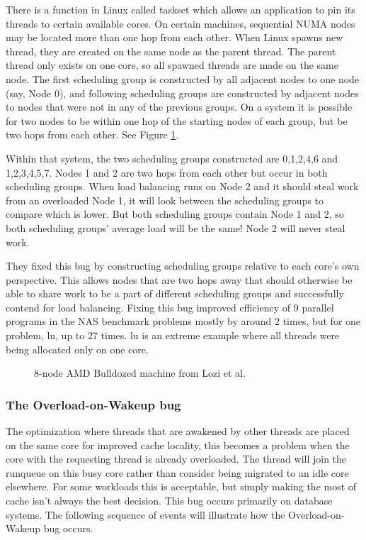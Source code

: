 \documentclass{sig-alternate}
\begin{document}
There is a function in Linux called taskset which allows an application to pin its threads to certain available cores. On certain machines, sequential NUMA nodes may be located more than one hop from each other. When Linux spawns new thread, they are created on the same node as the parent thread. The parent thread only exists on one core, so all spawned threads are made on the same node. The first scheduling group is constructed by all adjacent nodes to one node (say, Node 0), and following scheduling groups are constructed by adjacent nodes to nodes that were not in any of the previous groups. On a system it is possible for two nodes to be within one hop of the starting nodes of each group, but be two hops from each other. See Figure \ref{fig:cfs_schedgroups}.~\cite{Lozi:2016}

Within that system, the two scheduling groups constructed are {0,1,2,4,6} and {1,2,3,4,5,7}. Nodes 1 and 2 are two hops from each other but occur in both scheduling groups. When load balancing runs on Node 2 and it should steal work from an overloaded Node 1, it will look between the scheduling groups to compare which is lower. But both scheduling groups contain Node 1 and 2, so both scheduling groups' average load will be the same! Node 2 will never steal work.~\cite{Lozi:2016}

They fixed this bug by constructing scheduling groups relative to each core's own perspective. This allows nodes that are two hops away that should otherwise be able to share work to be a part of different scheduling groups and successfully contend for load balancing. Fixing this bug improved efficiency of 9 parallel programs in the NAS benchmark problems mostly by around 2 times, but for one problem, lu, up to 27 times. lu is an extreme example where all threads were being allocated only on one core.~\cite{Lozi:2016}

\begin{figure}
\centering
{}
\caption{8-node AMD Bulldozed machine from Lozi et al.~\cite{Lozi:2016}}
\label{fig:cfs_schedgroups}
\end{figure}

\subsubsection{The Overload-on-Wakeup bug}
\label{sec:cfsfault_overload}


The optimization where threads that are awakened by other threads are placed on the same core for improved cache locality, this becomes a problem when the core with the requesting thread is already overloaded. The thread will join the runqueue on this busy core rather than consider being migrated to an idle core elsewhere. For some workloads this is acceptable, but simply making the most of cache isn't always the best decision. This bug occurs primarily on database systems. The following sequence of events will illustrate how the Overload-on-Wakeup bug occurs.~\cite{Lozi:2016}
\end{document}

